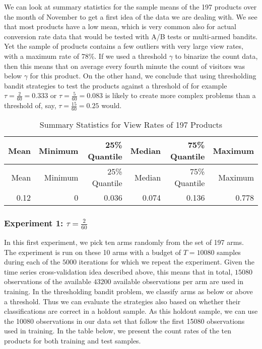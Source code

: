 \documentclass[12pt,]{article}
\begin{document}
We can look at summary statistics for the sample means of the 197
products over the month of November to get a first idea of the data we
are dealing with. We see that most products have a low mean, which is
very common also for actual conversion rate data that would be tested
with A/B tests or multi-armed bandits. Yet the sample of products
contains a few outliers with very large view rates, with a maximum rate
of 78\%. If we used a threshold \(\gamma\) to binarize the count data,
then this means that on average every fourth minute the count of
visitors was below \(\gamma\) for this product. On the other hand, we
conclude that using thresholding bandit strategies to test the products
against a threshold of for example \(\tau = \frac{2}{60} = 0.333\) or
\(\tau = \frac{5}{60} = 0.083\) is likely to create more complex
problems than a threshold of, say, \(\tau = \frac{15}{60} = 0.25\)
would.

\begin{longtable}[]{@{}rrrrrr@{}}
\caption{Summary Statistics for View Rates of 197
Products}\tabularnewline
\toprule
Mean & Minimum & 25\% Quantile & Median & 75\% Quantile &
Maximum\tabularnewline
\midrule
\endfirsthead
\toprule
Mean & Minimum & 25\% Quantile & Median & 75\% Quantile &
Maximum\tabularnewline
\midrule
\endhead
0.12 & 0 & 0.036 & 0.074 & 0.136 & 0.778\tabularnewline
\bottomrule
\end{longtable}

\subsubsection{\texorpdfstring{Experiment 1:
\(\tau = \frac{2}{60}\)}{Experiment 1: \textbackslash{}tau = \textbackslash{}frac\{2\}\{60\}}}\label{experiment-1-tau-frac260}

In this first experiment, we pick ten arms randomly from the set of 197
arms. The experiment is run on these 10 arms with a budget of
\(T=10080\) samples during each of the \(5000\) iterations for which we
repeat the experiment. Given the time series cross-validation idea
described above, this means that in total, \(15080\) observations of the
available \(43200\) available observations per arm are used in training.
In the thresholding bandit problem, we classify arms as below or above a
threshold. Thus we can evaluate the strategies also based on whether
their classifications are correct in a holdout sample. As this holdout
sample, we can use the 10080 observations in our data set that follow
the first 15080 observations used in training. In the table below, we
present the count rates of the ten products for both training and test
samples.
\end{document}
